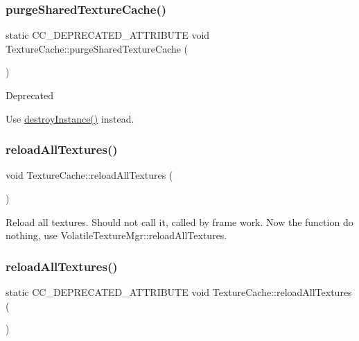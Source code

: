 \subsubsection{\texorpdfstring{purge\+Shared\+Texture\+Cache()}{purgeSharedTextureCache()}\hspace{0.1cm}{\footnotesize\ttfamily [2/2]}}
{\footnotesize\ttfamily static C\+C\+\_\+\+D\+E\+P\+R\+E\+C\+A\+T\+E\+D\+\_\+\+A\+T\+T\+R\+I\+B\+U\+TE void Texture\+Cache\+::purge\+Shared\+Texture\+Cache (\begin{DoxyParamCaption}{ }\end{DoxyParamCaption})\hspace{0.3cm}{\ttfamily [static]}}

\begin{DoxyRefDesc}{Deprecated}
\item[\hyperlink{deprecated__deprecated000369}{Deprecated}]Use \hyperlink{classTextureCache_a39aaf943d5c4969590a5f0c2f2008d68}{destroy\+Instance()} instead. \end{DoxyRefDesc}
\mbox{\label{classTextureCache_ab02c8d452f1ac6f8213b5931fbc1e89f}} 
\subsubsection{\texorpdfstring{reload\+All\+Textures()}{reloadAllTextures()}\hspace{0.1cm}{\footnotesize\ttfamily [1/2]}}
{\footnotesize\ttfamily void Texture\+Cache\+::reload\+All\+Textures (\begin{DoxyParamCaption}{ }\end{DoxyParamCaption})\hspace{0.3cm}{\ttfamily [static]}}

Reload all textures. Should not call it, called by frame work. Now the function do nothing, use Volatile\+Texture\+Mgr\+::reload\+All\+Textures. \mbox{\label{classTextureCache_ac70068345cc5744cf0be99ad51615275}} 
\subsubsection{\texorpdfstring{reload\+All\+Textures()}{reloadAllTextures()}\hspace{0.1cm}{\footnotesize\ttfamily [2/2]}}
{\footnotesize\ttfamily static C\+C\+\_\+\+D\+E\+P\+R\+E\+C\+A\+T\+E\+D\+\_\+\+A\+T\+T\+R\+I\+B\+U\+TE void Texture\+Cache\+::reload\+All\+Textures (\begin{DoxyParamCaption}{ }\end{DoxyParamCaption})\hspace{0.3cm}{\ttfamily [static]}}

